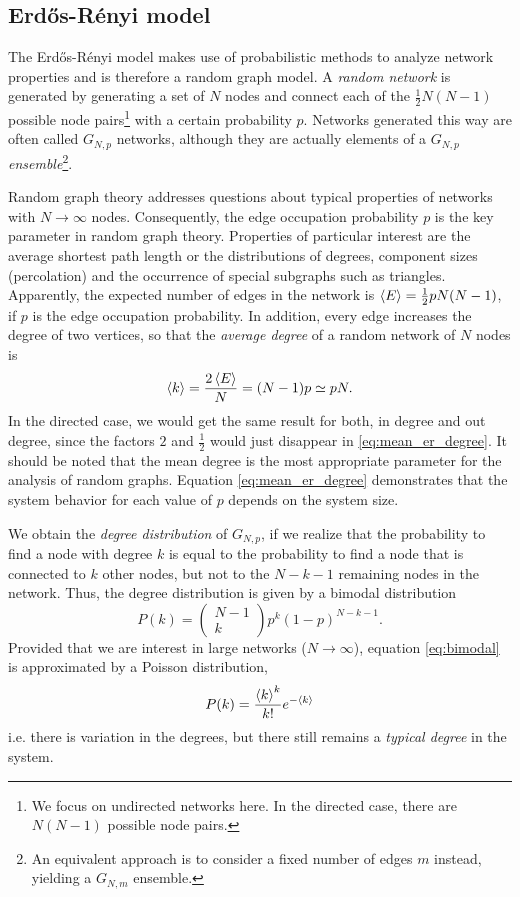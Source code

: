 \subsection{Erd\H{o}s-R\'enyi model}\label{sec:er_model}
The Erd\H{o}s-R\'enyi model makes use of probabilistic methods to analyze network properties and is therefore a random graph model.
A \emph{random network} is generated by generating a set of $N$ nodes and connect each of the $\frac{1}{2}N(N-1)$ possible node pairs\footnote{We focus on undirected networks here. In the directed case, there are $N(N-1)$ possible node pairs.} with a certain probability $p$.
Networks generated this way are often called $G_{N,p}$ networks, although they are actually elements of a $G_{N,p}$ \emph{ensemble}\footnote{An equivalent approach is to consider a fixed number of edges $m$ instead, yielding a $G_{N,m}$ ensemble.}.

Random graph theory addresses questions about typical properties of networks with $N\rightarrow \infty $ nodes.
Consequently, the edge occupation probability $p$ is the key parameter in random graph theory.
Properties of particular interest are the average shortest path length or the distributions of degrees, component sizes (percolation) and the occurrence of special subgraphs such as triangles.
Apparently, the expected number of edges in the network is $\left< E \right>=\frac{1}{2}pN(N-1)$, if $p$ is the edge occupation probability.
In addition, every edge increases the degree of two vertices, so that the \emph{average degree} of a random network of $N$ nodes is
\begin{equation}\label{eq:mean_er_degree}
\left< k \right>=\frac{2\left< E \right>}{N}=(N-1)p\simeq pN .
\end{equation}
In the directed case, we would get the same result for both, in degree and out degree, since the factors $2$ and $\frac{1}{2}$ would just disappear in \eqref{eq:mean_er_degree}.
It should be noted that the mean degree is the most appropriate parameter for the analysis of random graphs.
Equation \eqref{eq:mean_er_degree} demonstrates that the system behavior for each value of $p$ depends on the system size.

We obtain the \emph{degree distribution} of $G_{N,p}$, if we realize that the probability to find a node with degree $k$ is equal to the probability to find a node that is connected to $k$ other nodes, but not to the $N-k-1$ remaining nodes in the network.
Thus, the degree distribution is given by a bimodal distribution
\begin{equation}\label{eq:bimodal}
P(k)= \left(\begin{array}{c}N-1 \\k\end{array}\right) p^k (1-p)^{N-k-1} .
\end{equation}
Provided that we are interest in large networks ($N\rightarrow \infty $), equation \eqref{eq:bimodal} is approximated by a Poisson distribution, 
\begin{equation}\label{eq:poisson_distribution}
P(k) =\frac{\left< k \right>^k }{k!} e^{-\left< k \right>}
\end{equation}
i.e. there is variation in the degrees, but there still remains a \emph{typical degree} in the system.

